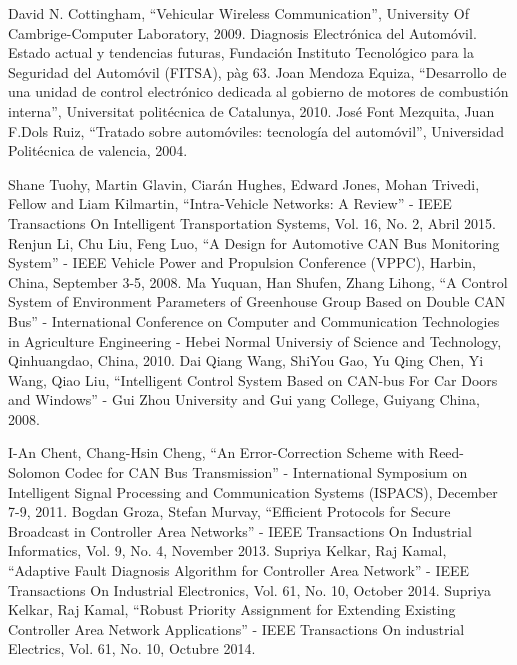 \begin{thebibliography}{99}


 David N. Cottingham, “Vehicular Wireless Communication”, University Of Cambrige-Computer Laboratory, 2009.
 Diagnosis Electrónica del Automóvil. Estado actual y tendencias futuras, Fundación Instituto Tecnológico para la Seguridad del Automóvil (FITSA), pàg 63.
 Joan Mendoza Equiza, “Desarrollo de una unidad de control electrónico dedicada al gobierno de motores de combustión interna”, Universitat politécnica de Catalunya, 2010.
 José Font Mezquita, Juan F.Dols Ruiz, “Tratado sobre automóviles: tecnología del automóvil”, Universidad Politécnica de valencia, 2004.


 Shane Tuohy, Martin Glavin, Ciarán Hughes, Edward Jones, Mohan Trivedi, Fellow  and Liam Kilmartin, “Intra-Vehicle Networks: A Review” - IEEE Transactions On Intelligent Transportation Systems, Vol. 16, No. 2, Abril 2015.
 Renjun Li, Chu Liu, Feng Luo, “A Design for Automotive CAN Bus Monitoring System” - IEEE Vehicle Power and Propulsion Conference (VPPC), Harbin, China, September 3-5, 2008.
 Ma Yuquan, Han Shufen, Zhang Lihong, “A Control System of Environment Parameters of Greenhouse Group Based on Double CAN Bus” - International Conference on Computer and Communication Technologies in Agriculture Engineering  - Hebei Normal Universiy of Science and Technology, Qinhuangdao, China, 2010. %
 Dai Qiang Wang, ShiYou Gao, Yu Qing Chen,  Yi Wang,  Qiao Liu, “Intelligent Control System Based on CAN-bus For Car Doors and Windows” - Gui Zhou University and Gui yang College, Guiyang China, 2008.

 I-An Chent, Chang-Hsin Cheng,  “An Error-Correction Scheme with Reed-Solomon Codec for CAN Bus Transmission” - International Symposium on Intelligent Signal Processing and Communication Systems (ISPACS), December 7-9, 2011.
 Bogdan Groza, Stefan Murvay, “Efficient Protocols for Secure Broadcast in Controller Area Networks” - IEEE Transactions On Industrial Informatics, Vol. 9, No. 4, November 2013. 
 Supriya Kelkar, Raj Kamal, “Adaptive Fault Diagnosis Algorithm for Controller Area Network” - IEEE Transactions On Industrial Electronics, Vol. 61, No. 10, October 2014. 
 Supriya Kelkar,  Raj Kamal, “Robust Priority Assignment for Extending Existing Controller Area Network  Applications” - IEEE Transactions On industrial Electrics, Vol. 61, No. 10, Octubre 2014.


\end{thebibliography}
